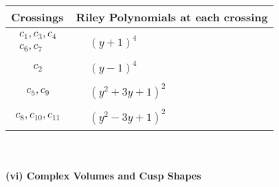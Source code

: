 \documentclass[1p]{elsarticle_modified}
\theoremstyle{definition}
\begin{document}
\begin{tabular}{m{50pt}|m{274pt}}
Crossings & \hspace{64pt}Riley Polynomials at each crossing \\
\hline $$\begin{aligned}c_{1},c_{3},c_{4}\\c_{6},c_{7}\end{aligned}$$&$\begin{aligned}
&(y+1)^4
\end{aligned}$\\
\hline $$\begin{aligned}c_{2}\end{aligned}$$&$\begin{aligned}
&(y-1)^4
\end{aligned}$\\
\hline $$\begin{aligned}c_{5},c_{9}\end{aligned}$$&$\begin{aligned}
&(y^2+3 y+1)^2
\end{aligned}$\\
\hline $$\begin{aligned}c_{8},c_{10},c_{11}\end{aligned}$$&$\begin{aligned}
&(y^2-3 y+1)^2
\end{aligned}$\\
\hline
\end{tabular}\\~\\
\newpage\flushleft \textbf{(vi) Complex Volumes and Cusp Shapes}
\end{document}
